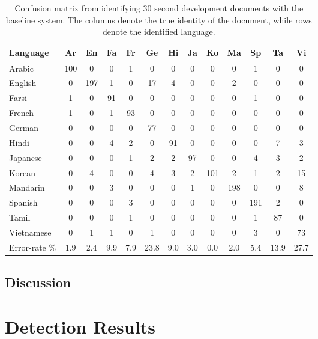 \begin{table}[hbt!]
\begin{tabular}{| l | c | c | c | c | c | c | c | c | c | c | c | c |}
\hline
Language &Ar & En & Fa & Fr & Ge & Hi & Ja & Ko & Ma & Sp & Ta & Vi \\
\hline
Arabic & 100 & 0 & 0 & 1 & 0 & 0 & 0 & 0 & 0 & 1 & 0 & 0 \\
English & 0 & 197  & 1 & 0 & 17 & 4 & 0 & 0 & 2 & 0 & 0 & 0 \\
Farsi & 1  & 0 & 91 & 0 & 0 & 0 & 0 & 0 & 0 & 1 & 0 & 0 \\
French & 1  & 0 & 1 & 93 & 0 & 0 & 0 & 0 & 0 & 0 & 0 & 0 \\
German & 0  & 0 & 0 & 0 & 77 & 0 & 0 & 0 & 0 & 0 & 0 & 0 \\
Hindi & 0  & 0 & 4 & 2 & 0 & 91 & 0 & 0 & 0 & 0 & 7 & 3 \\
Japanese & 0 & 0 & 0 & 1 & 2 & 2 & 97 & 0 & 0 & 4 & 3 & 2 \\
Korean & 0  & 4 & 0 & 0 & 4 & 3 & 2 & 101 & 2 & 1 & 2 & 15 \\
Mandarin & 0  & 0 & 3 & 0 & 0 & 0 & 1 & 0 & 198 & 0 & 0 &  8 \\
Spanish & 0  & 0 & 0 & 3 & 0 & 0 & 0 & 0 & 0 & 191 & 2 & 0 \\
Tamil & 0  & 0 & 0 & 1 & 0 & 0 & 0 & 0 & 0 & 1 & 87 & 0 \\
Vietnamese & 0 & 1 & 1 & 0 & 1 & 0 & 0 & 0 & 0 & 3 &  0 & 73 \\
\hline
Error-rate \%& 1.9 & 2.4 & 9.9 & 7.9 & 23.8 & 9.0 & 3.0 & 0.0 & 2.0 & 5.4 & 13.9 &  27.7 \\
\hline
\end{tabular}
\caption{Confusion matrix from identifying 30 second development documents with the baseline system. The columns denote the true identity of the document, while rows denote the identified language.}
\label{ivectidresults}
\end{table}

\section{Discussion}



\chapter{Detection Results}

